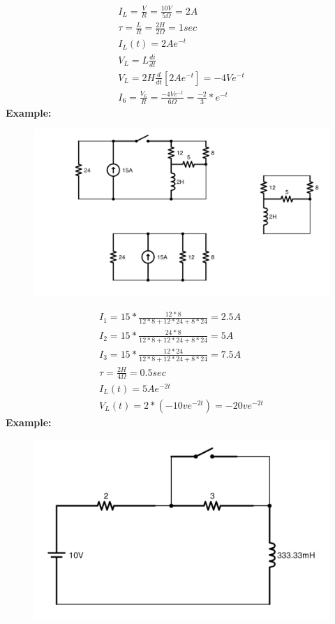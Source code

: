 \documentclass[a4paper,12]{article}
\begin{document}
\begin{gather}
    I_L=\frac{V}{R}=\frac{10V}{5\Omega}=2A\\
    \tau=\frac{L}{R}=\frac{2H}{2\Omega}=1sec\\
    I_L(t)=2Ae^{-t}\\
    V_L=L\frac{di}{dt}\\
    V_L=2H\frac{d}{dt}[2Ae^{-t}]=-4Ve^{-t}\\
    I_6=\frac{V_6}{R}=\frac{-4Ve^{-t}}{6\Omega}=\frac{-2}{3}*e^{-t}
\end{gather}
\textbf{Example:}
\begin{figure}[H]
    \centering
    \includegraphics[width=150mm]{Image/32.jpeg}
\end{figure}
\begin{gather}
    I_1=15*\frac{12*8}{12*8+12*24+8*24}=2.5A\\
    I_2=15*\frac{24*8}{12*8+12*24+8*24}=5A\\
    I_3=15*\frac{12*24}{12*8+12*24+8*24}=7.5A\\
    \tau=\frac{2H}{4\Omega}=0.5sec\\
    I_L(t)=5Ae^{-2t}\\
    V_L(t)=2*(-10ve^{-2t})=-20ve^{-2t}
\end{gather}
\textbf{Example:}
\begin{figure}[H]
    \centering
    \includegraphics[width=120mm]{Image/34.jpeg}
\end{figure}
\end{document}
